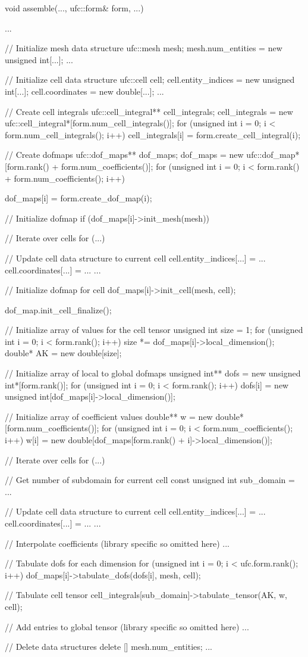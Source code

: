 \scriptsize
\begin{code}
void assemble(..., ufc::form& form, ...)
{
  ...

  // Initialize mesh data structure
  ufc::mesh mesh;
  mesh.num_entities = new unsigned int[...];
  ...

  // Initialize cell data structure
  ufc::cell cell;
  cell.entity_indices = new unsigned int[...];
  cell.coordinates = new double[...];
  ...

  // Create cell integrals
  ufc::cell_integral** cell_integrals;
  cell_integrals = new ufc::cell_integral*[form.num_cell_integrals()];
  for (unsigned int i = 0; i < form.num_cell_integrals(); i++)
    cell_integrals[i] = form.create_cell_integral(i);

  // Create dofmaps
  ufc::dof_maps** dof_maps;
  dof_maps = new ufc::dof_map*[form.rank() + form.num_coefficients()];
  for (unsigned int i = 0; i < form.rank() + form.num_coefficients(); i++)
  {
    dof_maps[i] = form.create_dof_map(i);

    // Initialize dofmap
    if (dof_maps[i]->init_mesh(mesh))
    { 
      // Iterate over cells
      for (...)
      {
        // Update cell data structure to current cell
        cell.entity_indices[...] = ...
        cell.coordinates[...] = ...
        ...
       
        // Initialize dofmap for cell
        dof_maps[i]->init_cell(mesh, cell);        
      }

      dof_map.init_cell_finalize();
    }
  }

  // Initialize array of values for the cell tensor
  unsigned int size = 1;
  for (unsigned int i = 0; i < form.rank(); i++)
    size *= dof_maps[i]->local_dimension();
  double* AK = new double[size];

  // Initialize array of local to global dofmaps
  unsigned int** dofs = new unsigned int*[form.rank()];
  for (unsigned int i = 0; i < form.rank(); i++)
    dofs[i] = new unsigned int[dof_maps[i]->local_dimension()];

  // Initialize array of coefficient values
  double** w = new double*[form.num_coefficients()];
  for (unsigned int i = 0; i < form.num_coefficients(); i++)
    w[i] = new double[dof_maps[form.rank() + i]->local_dimension()];

  // Iterate over cells
  for (...)
  {
    // Get number of subdomain for current cell
    const unsigned int sub_domain = ...

    // Update cell data structure to current cell
    cell.entity_indices[...] = ...
    cell.coordinates[...] = ...
    ...

    // Interpolate coefficients (library specific so omitted here)
    ...

    // Tabulate dofs for each dimension
    for (unsigned int i = 0; i < ufc.form.rank(); i++)
      dof_maps[i]->tabulate_dofs(dofs[i], mesh, cell);

    // Tabulate cell tensor
    cell_integrals[sub_domain]->tabulate_tensor(AK, w, cell);

    // Add entries to global tensor (library specific so omitted here)
    ...
  }

  // Delete data structures
  delete [] mesh.num_entities;
  ...
}
\end{code}
\normalsize
